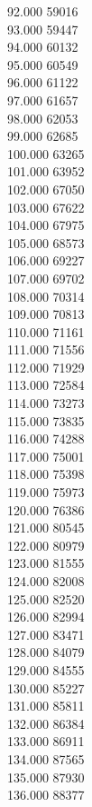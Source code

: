 { 92.000	59016 \\
 93.000	59447 \\
 94.000	60132 \\
 95.000	60549 \\
 96.000	61122 \\
 97.000	61657 \\
 98.000	62053 \\
 99.000	62685 \\
 100.000	63265 \\
 101.000	63952 \\
 102.000	67050 \\
 103.000	67622 \\
 104.000	67975 \\
 105.000	68573 \\
 106.000	69227 \\
 107.000	69702 \\
 108.000	70314 \\
 109.000	70813 \\
 110.000	71161 \\
 111.000	71556 \\
 112.000	71929 \\
 113.000	72584 \\
 114.000	73273 \\
 115.000	73835 \\
 116.000	74288 \\
 117.000	75001 \\
 118.000	75398 \\
 119.000	75973 \\
 120.000	76386 \\
 121.000	80545 \\
 122.000	80979 \\
 123.000	81555 \\
 124.000	82008 \\
 125.000	82520 \\
 126.000	82994 \\
 127.000	83471 \\
 128.000	84079 \\
 129.000	84555 \\
 130.000	85227 \\
 131.000	85811 \\
 132.000	86384 \\
 133.000	86911 \\
 134.000	87565 \\
 135.000	87930 \\
 136.000	88377 \\
}
